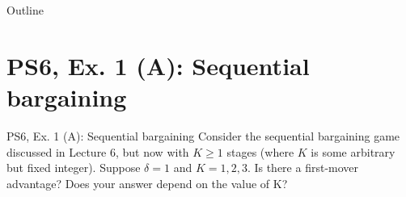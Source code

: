 

\maketitle

  \newcommand{\intuition}[1]{#1} %


\begin{frame}{Outline}
    \tableofcontents
\end{frame}

\section{PS6, Ex. 1 (A): Sequential bargaining }

\begin{frame}{PS6, Ex. 1 (A): Sequential bargaining  }
Consider the sequential bargaining game discussed in Lecture 6, but now with $K \geq 1$ stages (where $K$ is some arbitrary but fixed integer). Suppose $\delta = 1$ and $K=1,2,3$. Is there a first-mover advantage? Does your answer depend on the value of K?
    \vfill\null
\end{frame}

